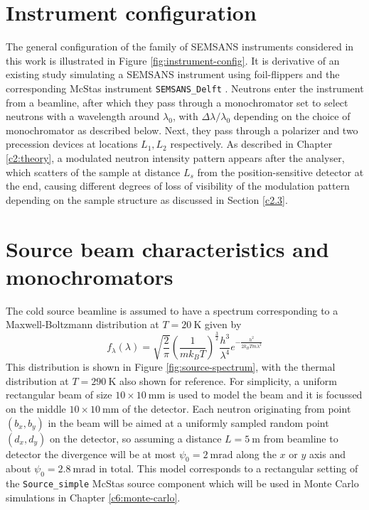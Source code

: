 \section{Instrument configuration}
\label{c3.1}
The general configuration of the family of SEMSANS instruments considered in this work is illustrated in Figure \ref{fig:instrument-config}. It is derivative of an existing study simulating a SEMSANS instrument using foil-flippers and the corresponding McStas instrument \texttt{SEMSANS\_Delft} \cite{bouwman2021b}. Neutrons enter the instrument from a beamline, after which they pass through a monochromator set to select neutrons with a wavelength around $\lambda_0$, with  $\Delta\lambda/\lambda_0$ depending on the choice of monochromator as described below. Next, they pass through a polarizer and two precession devices at locations $L_1, L_2$ respectively. As described in Chapter \ref{c2:theory}, a modulated neutron intensity pattern appears after the analyser, which scatters of the sample at distance $L_s$ from the position-sensitive detector at the end, causing different degrees of loss of visibility of the modulation pattern depending on the sample structure as discussed in Section \ref{c2.3}. 

\section{Source beam characteristics and monochromators}
\label{c3.2}
The cold source beamline is assumed to have a spectrum corresponding to a Maxwell-Boltzmann distribution at $T = \SI{20}{\kelvin}$ given by 
\begin{equation}
	f_\lambda(\lambda) = \sqrt{\frac{2}{\pi}}\left(\frac{1}{mk_BT}\right)^{\frac{3}{2}}\frac{h^3}{\lambda^4}e^{-\frac{h^2}{2k_BTm\lambda^2}} \label{eq:cold-source-spectrum}
\end{equation}
This distribution is shown in Figure \ref{fig:source-spectrum}, with the thermal distribution at $T= \SI{290}{\kelvin}$ also shown for reference. For simplicity, a uniform rectangular beam of size $10\times10~\unit{\milli\meter}$ is used to model the beam and it is focussed on the middle $10\times10~\unit{\milli\meter}$ of the detector. Each neutron originating from point $(b_x,b_y)$ in the beam will be aimed at a uniformly sampled random point $(d_x, d_y)$ on the detector, so assuming a distance $L = \SI{5}{\meter}$ from beamline to detector the divergence will be at most $\psi_0 = \SI{2}{\milli\radian}$ along the $x$ or $y$ axis and about $\psi_0 = \SI{2.8}{\milli\radian}$ in total. This model corresponds to a rectangular setting of the \texttt{Source\_simple} McStas source component which will be used in Monte Carlo simulations in Chapter \ref{c6:monte-carlo}.  

